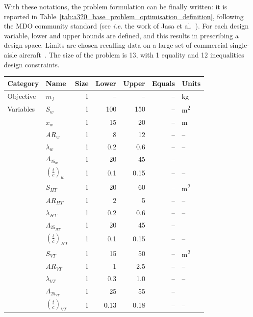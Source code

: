 With these notations, the problem formulation can be finally written: it is reported in Table~\ref{tab:a320_base_problem_optimisation_definition}, following the MDO community standard (see \textit{i.e.} the work of Jasa et al.~\cite{bib:jasa_topology}).
For each design variable, lower and upper bounds are defined, and this results in prescribing a design space. 
Limits are chosen recalling data on a large set of commercial single-aisle aircraft~\cite{bib:roskam_partII}. 
The size of the problem is 13, with 1 equality and 12 inequalities design constraints. 
\begin{table}[h!]
	\centering
	\begin{tabular}{l l r r r r l}
		\hline
		\textbf{Category} & \textbf{Name} & \textbf{Size} & \textbf{Lower} & \textbf{Upper} & \textbf{Equals} & \textbf{Units} \\
		\hline
		Objective & $m_f$ & 1 & -- & -- & -- & \si{\kilogram} \\
		\hline
		Variables & $S_w$ & 1 & \num{100} & \num{150} & -- & \si{\square\meter} \\
		& $x_w$ & 1 & \num{15} & \num{20} & -- & \si{\meter} \\
		& $AR_{w}$ & 1 & \num{8} & \num{12} & -- & -- \\
		& $\lambda_{w}$ & 1 & \num{0.2} & \num{0.6} & -- & -- \\
		& $\Lambda_{25_{w}}$ & 1 & \num{20} & \num{45} & -- & \si{\deg} \\
		& $\left(\frac{t}{c}\right)_w$ & 1 & \num{0.1} & \num{0.15} & -- & -- \\
		& $S_{HT}$ & 1 & \num{20} & \num{60} & -- & \si{\square\meter} \\
		& $AR_{HT}$ & 1 & \num{2} & \num{5} & -- & -- \\
		& $\lambda_{HT}$ & 1 & \num{0.2} & \num{0.6} & -- & -- \\
		& $\Lambda_{25_{HT}}$ & 1 & \num{20} & \num{45} & -- & \si{\deg} \\
		& $\left(\frac{t}{c}\right)_{HT}$ & 1 & \num{0.1} & \num{0.15} & -- & -- \\
		& $S_{VT}$ & 1 & \num{15} & \num{50} & -- & \si{\square\meter} \\
		& $AR_{VT}$ & 1 & \num{1} & \num{2.5} & -- & -- \\
		& $\lambda_{VT}$ & 1 & \num{0.3} & \num{1.0} & -- & -- \\
		& $\Lambda_{25_{VT}}$ & 1 & \num{25} & \num{55} & -- & \si{\deg} \\
		& $\left(\frac{t}{c}\right)_{VT}$ & 1 & \num{0.13} & \num{0.18} & -- & -- \\

\end{tabular}
\end{table}
